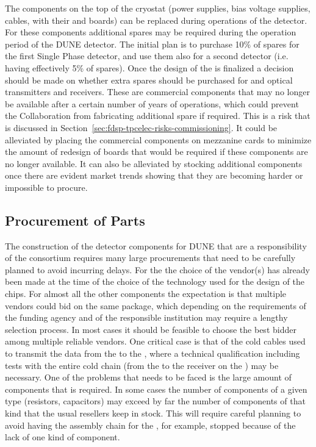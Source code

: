 The components on the top of the cryostat (power supplies, bias
voltage supplies, cables,  with their 
and  boards) can be replaced during operations of the
detector. For these components additional spares may be required
during the \dunelifetime operation period of the DUNE detector.
The initial plan is to purchase 10\% of spares for the first
Single  Phase detector, and use them also for a second detector
(i.e. having effectively 5\% of spares). Once the design of
the  is finalized a decision should be made on whether
extra spares should be purchased for  and optical
transmitters and receivers. These are commercial components 
that may no longer be available after a certain number of 
years of operations, which could prevent the Collaboration from
fabricating additional spare  if required. This
is a risk that is discussed in Section~\ref{sec:fdsp-tpcelec-risks-commissioning}.
It could be alleviated by placing the commercial components
on mezzanine cards to minimize the amount of redesign of
boards that would be required if these components are no longer available.
It can also be alleviated by stocking additional components
once there are evident market trends showing that they are 
becoming harder or impossible to procure.

\subsection{Procurement of Parts}
\label{sec:fdsp-tpcelec-production-procurement}

The construction of the detector components for DUNE that are a
responsibility of the  consortium requires many
large procurements that need to be carefully planned to avoid
incurring delays. For the  the choice of the vendor(s)
has already been made at the time of the choice of the technology
used for the design of the chips. For almost all the other components
the expectation is that multiple vendors could bid on the same 
package, which depending on the requirements of the funding
agency and of the responsible institution may require a lengthy
selection process. In most cases it should be feasible to choose
the best bidder among multiple reliable vendors. One critical case
is that of the cold cables used to transmit the data from the
 to the , where a technical qualification
including tests with the entire cold chain (from the 
to the receiver on the ) may be necessary. One of the
problems that needs to be faced is the large amount of components
that is required. In some cases the number of components of a given
type (resistors, capacitors) may exceed by far the number of components
of that kind that the usual resellers keep in stock. This will 
require careful planning to avoid having the assembly chain for
the , for example, stopped because of the lack of
one kind of component.

